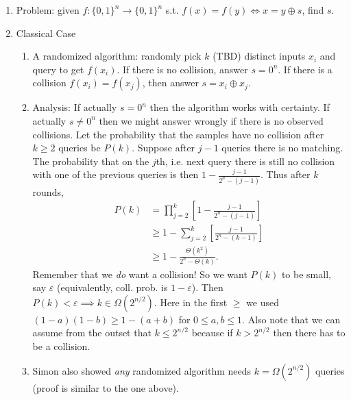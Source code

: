 \begin{enumerate}
    \item Problem: given $f: \{0,1\}^n \rightarrow \{0,1\}^n$ s.t. $f(x)=f(y) \iff x=y\oplus s$, find $s$. 
    \item Classical Case
    \begin{enumerate}
        \item A randomized algorithm: randomly pick $k$ (TBD) distinct inputs $x_i$ and query to get $f(x_i)$. If there is no collision, answer $s=0^n$. If there is a collision $f(x_i)=f(x_j)$, then answer $s=x_i \oplus x_j$. 
        \item Analysis: If actually $s=0^n$ then the algorithm works with certainty. If actually $s \neq 0^n$ then we might answer wrongly if there is no observed collisions. Let the probability that the samples have no collision after $k\geq 2$ queries be $P(k)$. Suppose after $j-1$ queries there is no matching. The probability that on the $j$th, i.e. next query there is still no collision with one of the previous queries is then $1-\frac{j-1}{2^n-(j-1)}$. Thus after $k$ rounds,
        \begin{align*}
            P(k) &= \prod_{j=2}^k \left[ 1- \frac{j-1}{2^n-(j-1)} \right]\\
            &\geq 1-\sum_{j=2}^k \left[ \frac{j-1}{2^n-(k-1)} \right]\\
            &\geq 1- \frac{\Theta(k^2)}{2^n-\Theta(k)}.
        \end{align*}
        Remember that we \textit{do} want a collision! So we want $P(k)$ to be small, say $\varepsilon$ (equivalently, coll. prob. is $1-\varepsilon$). Then $P(k)<\varepsilon \implies k \in \Omega(2^{n/2})$. Here in the first $\geq$ we used $(1-a)(1-b)\geq 1-(a+b)$ for $0\leq a,b \leq 1$. Also note that we can assume from the outset that $k\leq 2^{n/2}$ because if $k>2^{n/2}$ then there has to be a collision.
        \item Simon also showed \textit{any} randomized algorithm needs $k=\Omega(2^{n/2})$ queries (proof is similar to the one above).
    \end{enumerate}
    

\end{enumerate}
